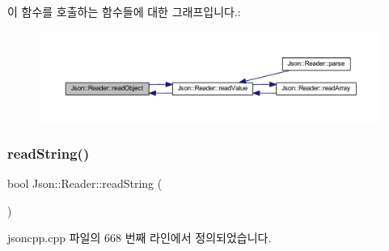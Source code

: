 이 함수를 호출하는 함수들에 대한 그래프입니다.\+:\nopagebreak
\begin{figure}[H]
\begin{center}
\leavevmode
\includegraphics[width=350pt]{class_json_1_1_reader_a0068eb3d8e86e91f0e4806f60da66b9c_icgraph}
\end{center}
\end{figure}
\mbox{\label{class_json_1_1_reader_a6328a0b1994e05118886f9fc9c608643}} 
\subsubsection{\texorpdfstring{read\+String()}{readString()}}
{\footnotesize\ttfamily bool Json\+::\+Reader\+::read\+String (\begin{DoxyParamCaption}{ }\end{DoxyParamCaption})\hspace{0.3cm}{\ttfamily [private]}}



jsoncpp.\+cpp 파일의 668 번째 라인에서 정의되었습니다.


